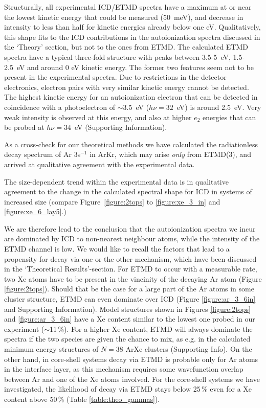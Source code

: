 \documentclass[journal=jpccck,manuscript=article]{achemso}
\begin{document}
Structurally, all experimental ICD/ETMD spectra have a maximum at or near the lowest kinetic energy that could be measured (50~meV), and decrease in intensity to less than half for kinetic energies already below one eV. 
Qualitatively, this shape fits to the ICD contributions in the autoionization spectra discussed in the `Theory' section, but not to the ones from ETMD. 
The calculated ETMD spectra have a typical three-fold structure with peaks between 3.5-5~eV, 1.5-2.5~eV and around 0 eV kinetic energy. 
The former two features seem not to be present in the experimental spectra. 
Due to restrictions in the detector electronics, electron pairs with very similar kinetic energy cannot be detected. 
The highest kinetic energy for an autoionization electron that can be detected in coincidence with a photoelectron of $\sim3.5$~eV ($h\nu = 32$~eV) is around 2.5~eV.
Very weak intensity is observed at this energy, and also at higher $e_2$ energies that can be probed at $h\nu = 34$~eV (Supporting Information).

As a cross-check for our theoretical methods we have calculated the radiationless decay spectrum of Ar 3s$^{-1}$ in ArKr, which may arise {\it only} from ETMD(3),\cite{foerstel} and arrived at qualitative agreement with the experimental data.\cite{arkr}

The size-dependent trend within the experimental data is in qualitative agreement to the change in the calculated spectral shape for ICD in systems of increased size (compare Figure~\ref{figure:2tops} to \ref{figure:xe_3_in} and \ref{figure:xe_6_lay5}.)

We are therefore lead to the conclusion that the autoionization spectra we incur are dominated by ICD to non-nearest neighbour atoms, while the intensity of the ETMD channel is low. 
We would like to recall the factors that lead to a propensity for decay via one or the other mechanism, which have been discussed in the `Theoretical Results'-section.
For ETMD to occur with a measurable rate, two Xe atoms have to be present in the vincinity of the decaying Ar atom (Figure \ref{figure:2tops}).
Should that be the case for a large part of the Ar atoms in some cluster structure, ETMD can even dominate over ICD (Figure \ref{figure:ar_3_6in} and Supporting Information).
Model structures shown in Figures \ref{figure:2tops} and \ref{figure:ar_3_6in} have a Xe content similar to the lowest one probed in our experiment ($\sim$11\,\%).
For a higher Xe content, ETMD will always dominate the spectra if the two species are given the chance to mix, as e.g. in the calculated minimum energy structures of $N=38$ ArXe clusters (Supporting Info).
On the other hand, in core-shell systems decay via ETMD is probable only for Ar atoms in the interface layer, as this mechanism requires some wavefunction overlap between Ar and one of the Xe atoms involved.
For the core-shell systems we have investigated, the likelihood of decay via ETMD stays below 25\,\% even for a Xe content above 50\,\% (Table \ref{table:theo_gammas}).
\end{document}
